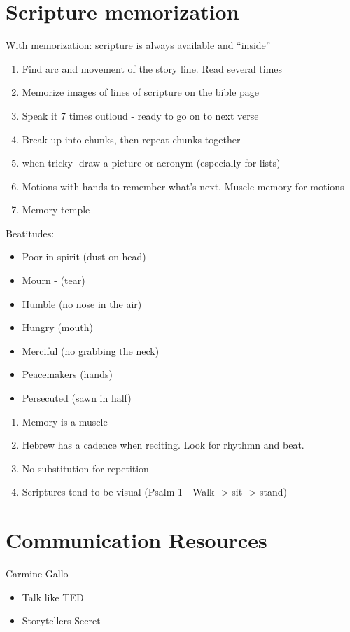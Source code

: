 \documentclass[
]{book}
\providecommand{\tightlist}{%
  \setlength{\itemsep}{0pt}\setlength{\parskip}{0pt}}
\begin{document}
\hypertarget{scripture-memorization}{%
\chapter{Scripture memorization}\label{scripture-memorization}}

With memorization: scripture is always available and ``inside''

\begin{enumerate}
\def\labelenumi{\arabic{enumi})}
\item
  Find arc and movement of the story line. Read several times
\item
  Memorize images of lines of scripture on the bible page
\item
  Speak it 7 times outloud - ready to go on to next verse
\item
  Break up into chunks, then repeat chunks together
\item
  when tricky- draw a picture or acronym (especially for lists)
\item
  Motions with hands to remember what's next. Muscle memory for motions
\item
  Memory temple
\end{enumerate}

Beatitudes:

\begin{itemize}
\tightlist
\item
  Poor in spirit (dust on head)
\item
  Mourn - (tear)
\item
  Humble (no nose in the air)
\item
  Hungry (mouth)
\item
  Merciful (no grabbing the neck)
\item
  Peacemakers (hands)
\item
  Persecuted (sawn in half)
\end{itemize}

\begin{enumerate}
\def\labelenumi{\arabic{enumi})}
\setcounter{enumi}{7}
\item
  Memory is a muscle
\item
  Hebrew has a cadence when reciting. Look for rhythmn and beat.
\item
  No substitution for repetition
\item
  Scriptures tend to be visual (Psalm 1 - Walk -\textgreater{} sit -\textgreater{} stand)
\end{enumerate}

\hypertarget{communication-resources}{%
\chapter{Communication Resources}\label{communication-resources}}

Carmine Gallo

\begin{itemize}
\tightlist
\item
  Talk like TED
\item
  Storytellers Secret
\end{itemize}
\end{document}
